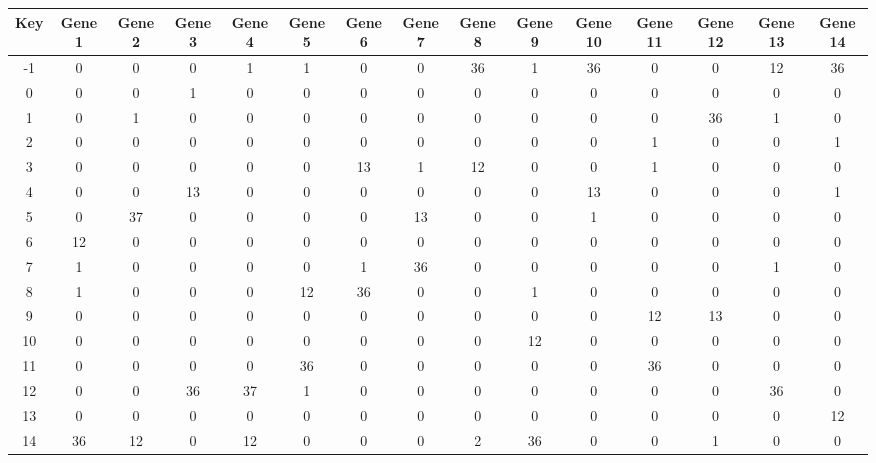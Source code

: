 \begin{tabular}{|c|c|c|c|c|c|c|c|c|c|c|c|c|c|c|}
\hline
Key & Gene 1 & Gene 2 & Gene 3 & Gene 4 & Gene 5 & Gene 6 & Gene 7 & Gene 8 & Gene 9 & Gene 10 & Gene 11 & Gene 12 & Gene 13 & Gene 14 \\
\hline
-1 & 0 & 0 & 0 & 1 & 1 & 0 & 0 & 36 & 1 & 36 & 0 & 0 & 12 & 36 \\
0 & 0 & 0 & 1 & 0 & 0 & 0 & 0 & 0 & 0 & 0 & 0 & 0 & 0 & 0 \\
1 & 0 & 1 & 0 & 0 & 0 & 0 & 0 & 0 & 0 & 0 & 0 & 36 & 1 & 0 \\
2 & 0 & 0 & 0 & 0 & 0 & 0 & 0 & 0 & 0 & 0 & 1 & 0 & 0 & 1 \\
3 & 0 & 0 & 0 & 0 & 0 & 13 & 1 & 12 & 0 & 0 & 1 & 0 & 0 & 0 \\
4 & 0 & 0 & 13 & 0 & 0 & 0 & 0 & 0 & 0 & 13 & 0 & 0 & 0 & 1 \\
5 & 0 & 37 & 0 & 0 & 0 & 0 & 13 & 0 & 0 & 1 & 0 & 0 & 0 & 0 \\
6 & 12 & 0 & 0 & 0 & 0 & 0 & 0 & 0 & 0 & 0 & 0 & 0 & 0 & 0 \\
7 & 1 & 0 & 0 & 0 & 0 & 1 & 36 & 0 & 0 & 0 & 0 & 0 & 1 & 0 \\
8 & 1 & 0 & 0 & 0 & 12 & 36 & 0 & 0 & 1 & 0 & 0 & 0 & 0 & 0 \\
9 & 0 & 0 & 0 & 0 & 0 & 0 & 0 & 0 & 0 & 0 & 12 & 13 & 0 & 0 \\
10 & 0 & 0 & 0 & 0 & 0 & 0 & 0 & 0 & 12 & 0 & 0 & 0 & 0 & 0 \\
11 & 0 & 0 & 0 & 0 & 36 & 0 & 0 & 0 & 0 & 0 & 36 & 0 & 0 & 0 \\
12 & 0 & 0 & 36 & 37 & 1 & 0 & 0 & 0 & 0 & 0 & 0 & 0 & 36 & 0 \\
13 & 0 & 0 & 0 & 0 & 0 & 0 & 0 & 0 & 0 & 0 & 0 & 0 & 0 & 12 \\
14 & 36 & 12 & 0 & 12 & 0 & 0 & 0 & 2 & 36 & 0 & 0 & 1 & 0 & 0 \\
\hline
\end{tabular}